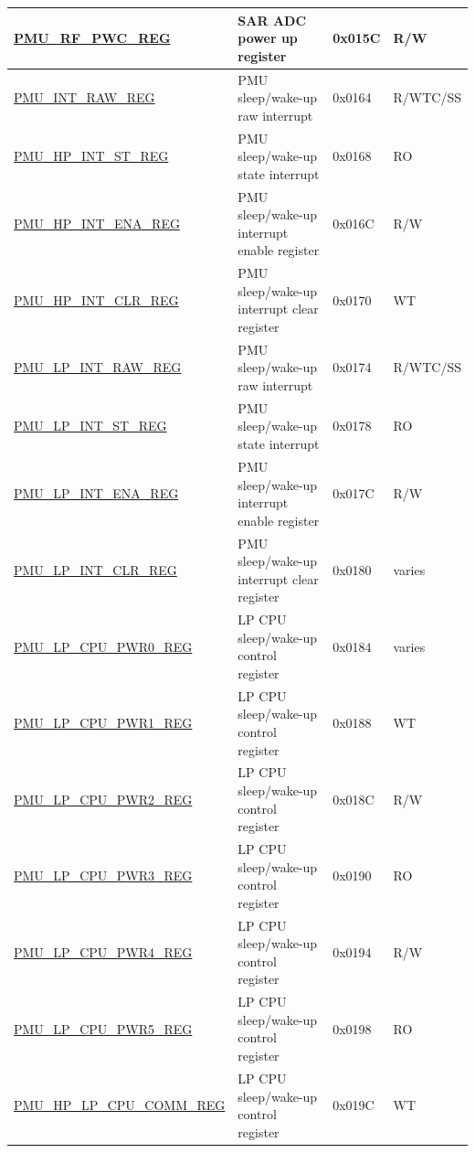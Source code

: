 \begin{longtable}{ | l | L{6cm} | l | l | }
\hyperref[regdesc:PMURFPWCREG]{PMU\_RF\_PWC\_REG} & SAR ADC power up register & 0x015C & R/W \\ \hline

\hyperref[regdesc:PMUINTRAWREG]{PMU\_INT\_RAW\_REG} & PMU sleep/wake-up raw interrupt & 0x0164 & R/WTC/SS \\ \hline
\hyperref[regdesc:PMUHPINTSTREG]{PMU\_HP\_INT\_ST\_REG} & PMU sleep/wake-up state interrupt & 0x0168 & RO \\ \hline
\hyperref[regdesc:PMUHPINTENAREG]{PMU\_HP\_INT\_ENA\_REG} & PMU sleep/wake-up interrupt enable register & 0x016C & R/W \\ \hline
\hyperref[regdesc:PMUHPINTCLRREG]{PMU\_HP\_INT\_CLR\_REG} & PMU sleep/wake-up interrupt clear register & 0x0170 & WT \\ \hline
\hyperref[regdesc:PMULPINTRAWREG]{PMU\_LP\_INT\_RAW\_REG} & PMU sleep/wake-up raw interrupt & 0x0174 & R/WTC/SS \\ \hline
\hyperref[regdesc:PMULPINTSTREG]{PMU\_LP\_INT\_ST\_REG} & PMU sleep/wake-up state interrupt & 0x0178 & RO \\ \hline
\hyperref[regdesc:PMULPINTENAREG]{PMU\_LP\_INT\_ENA\_REG} &  PMU sleep/wake-up interrupt enable register & 0x017C & R/W \\ \hline
\hyperref[regdesc:PMULPINTCLRREG]{PMU\_LP\_INT\_CLR\_REG} & PMU sleep/wake-up interrupt clear register & 0x0180 & varies \\ \hline
\hyperref[regdesc:PMULPCPUPWR0REG]{PMU\_LP\_CPU\_PWR0\_REG} & LP CPU sleep/wake-up control register & 0x0184 & varies \\ \hline
\hyperref[regdesc:PMULPCPUPWR1REG]{PMU\_LP\_CPU\_PWR1\_REG} & LP CPU sleep/wake-up control register & 0x0188 & WT \\ \hline
\hyperref[regdesc:PMULPCPUPWR2REG]{PMU\_LP\_CPU\_PWR2\_REG} & LP CPU sleep/wake-up control register & 0x018C & R/W \\ \hline
\hyperref[regdesc:PMULPCPUPWR3REG]{PMU\_LP\_CPU\_PWR3\_REG} & LP CPU sleep/wake-up control register & 0x0190 & RO \\ \hline
\hyperref[regdesc:PMULPCPUPWR4REG]{PMU\_LP\_CPU\_PWR4\_REG} & LP CPU sleep/wake-up control register & 0x0194 & R/W \\ \hline
\hyperref[regdesc:PMULPCPUPWR5REG]{PMU\_LP\_CPU\_PWR5\_REG} & LP CPU sleep/wake-up control register & 0x0198 & RO \\ \hline
\hyperref[regdesc:PMUHPLPCPUCOMMREG]{PMU\_HP\_LP\_CPU\_COMM\_REG} & LP CPU sleep/wake-up control register & 0x019C & WT \\ \hline


\end{longtable}
